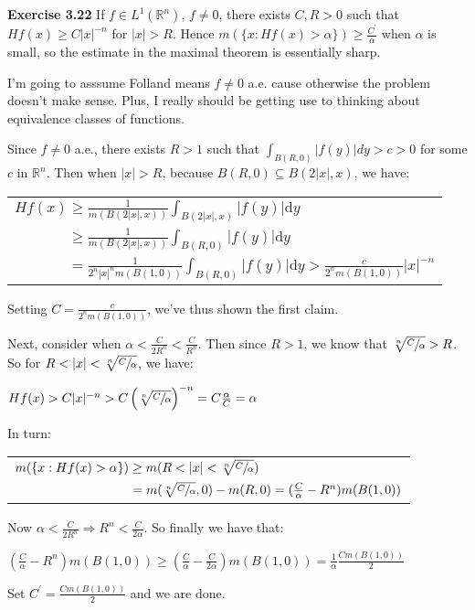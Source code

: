 \documentclass{book}
\newcommand{\exTwoP}{%
   \color{RedViolet}%
   \fontsize{13}{15}\selectfont%
}
\newenvironment{myIndent}{%
   \begin{adjustwidth}{2.5em}{0em}%
}{%
   \end{adjustwidth}%
}
\newcommand{\blab}[1]{\textbf{#1}}
\newcommand{\df}{\mathrm{d}}
\newcommand{\retTwo}{\hfill\bigbreak}
\begin{document}
\blab{Exercise 3.22} If $f \in L^1(\mathbb{R}^n)$, $f \neq 0$, there exists $C, R > 0$ such that $Hf(x) \geq C|x|^{-n}$ for $|x| > R$. Hence $m(\{x : Hf(x) > \alpha\}) \geq \frac{C^\prime}{\alpha}$ when $\alpha$ is small, so the estimate in the maximal theorem is essentially sharp.

\begin{myIndent}\exTwoP
	I'm going to asssume Folland means $f \neq 0$ a.e. cause otherwise the problem doesn't make sense. Plus, I really should be getting use to thinking about equivalence classes of functions.\retTwo

	Since $f \neq 0$ a.e., there exists $R > 1$ such that $\int_{B(R, 0)} |f(y)|dy > c > 0$ for some $c$ in $\mathbb{R}^n$. Then when $|x| > R$, because $B(R, 0) \subseteq B(2|x|, x)$, we have:\\ [-8pt]

	{\centering\begin{tabular}{l}
		$Hf(x) \geq \frac{1}{m(B(2|x|, x))}\int_{B(2|x|, x)}|f(y)|\df y$\\ [12pt]
		$\phantom{Hf(x)} \geq \frac{1}{m(B(2|x|, x))}\int_{B(R, 0)}|f(y)|\df y$\\ [12pt]
		$\phantom{Hf(x)} = \frac{1}{2^n|x|^n m(B(1, 0))}\int_{B(R, 0)}|f(y)|\df y > \frac{c}{2^n m(B(1, 0))}|x|^{-n}$
	\end{tabular}\retTwo\par}

	Setting $C = \frac{c}{2^n m(B(1, 0))}$, we've thus shown the first claim.\newpage

	Next, consider when $\alpha < \frac{C}{2R^n} < \frac{C}{R^n}$. Then since $R > 1$, we know that $\sqrt[n]{\sfrac{C}{\alpha}} > R$. So for $R < |x| < \sqrt[n]{\sfrac{C}{\alpha}}$, we have:
	
	{\centering $Hf(x) > C|x|^{-n} > C\left(\sqrt[n]{\sfrac{C}{\alpha}}\right)^{-n} = C\frac{\alpha}{C} = \alpha$ \retTwo\par}

	In turn:
	
	{\centering\begin{tabular}{l}
		$m(\{x: Hf(x) > \alpha\}) \geq m(R < |x| < \sqrt[n]{\sfrac{C}{\alpha}})$\\
		$\phantom{m(\{x: Hf(x) > \alpha\})} = m(\sqrt[n]{\sfrac{C}{\alpha}}, 0) - m(R, 0) = (\frac{C}{\alpha} - R^n)m(B(1,0))$
	\end{tabular}\retTwo\par}
	
	Now $\alpha < \frac{C}{2R^n} \Longrightarrow R^n < \frac{C}{2\alpha}$. So finally we have that:

	{\centering $(\frac{C}{\alpha} - R^n)m(B(1,0)) \geq (\frac{C}{\alpha} - \frac{C}{2\alpha})m(B(1,0)) = \frac{1}{\alpha}\frac{Cm(B(1,0))}{2}$ \retTwo\par}

	Set $C^\prime = \frac{Cm(B(1,0))}{2}$ and we are done.\retTwo
\end{myIndent}
\end{document}
